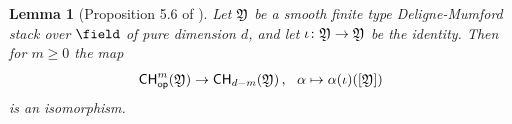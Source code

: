 \documentclass[a4paper,12pt]{article} %
\theoremstyle{definition}
\theoremstyle{plain}%
\newtheorem{lemma}[definition]{Lemma}
\newcommand{\Picabs}{\mathfrak{Pic}}
\newcommand{\Chow}{\mathsf{CH}}
\newcommand{\CHop}{\Chow_{\mathsf{op}}}
\newcommand{\jocomment}[1]{}
\begin{document}
\begin{lemma}[Proposition 5.6 of \cite{Vistoli1989Intersection-th}]\label{lem:op_eq_ch_for_smooth}
Let $\frak Y$ be a smooth finite type Deligne-Mumford stack over ${\field}$ of pure dimension $d$, and 
let $\iota\colon \frak Y \to \frak Y$ be the identity. Then for $m \geq 0$ the map 
\begin{equation}\label{eq_chop_to_chow}
\CHop^m(\frak Y) \to \Chow_{d-m}(\frak Y)\,, \ \ \alpha \mapsto \alpha(\iota)([\frak Y])
\end{equation}
is an isomorphism.
\end{lemma}

%
%
%
%
\end{document}
